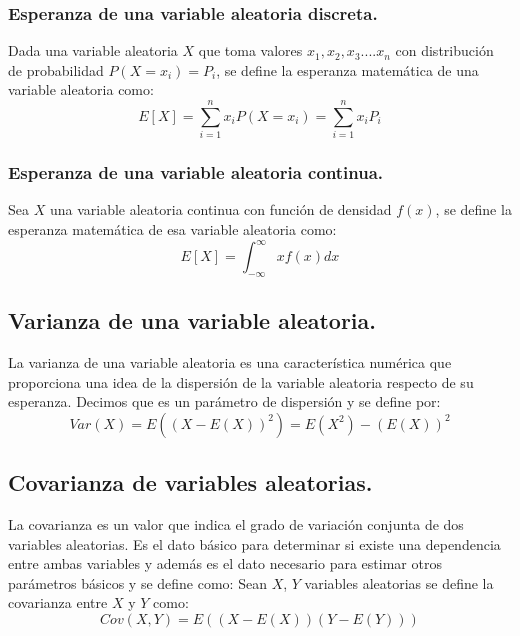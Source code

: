 \documentclass[
  12pt,
]{krantz}
\theoremstyle{definition}
\theoremstyle{definition}
\theoremstyle{definition}
\theoremstyle{remark}
\begin{document}
\hypertarget{esperanza-de-una-variable-aleatoria-discreta.}{%
\subsubsection{Esperanza de una variable aleatoria discreta.}\label{esperanza-de-una-variable-aleatoria-discreta.}}

Dada una variable aleatoria \(X\) que toma valores \(x_1,x_2,x_3....x_n\) con distribución de probabilidad \(P(X=x_i)=P_i\), se define la esperanza matemática de una variable aleatoria como: \[E[X]=\sum_{i=1}^{n}x_iP(X=x_i)=\sum_{i=1}^{n}x_iP_i\]

\hypertarget{esperanza-de-una-variable-aleatoria-continua.}{%
\subsubsection{Esperanza de una variable aleatoria continua.}\label{esperanza-de-una-variable-aleatoria-continua.}}

Sea \(X\) una variable aleatoria continua con función de densidad \(f(x)\), se define la esperanza matemática de esa variable aleatoria como:\[E[X]=\int_{-\infty}^{\infty}xf(x)dx\]

\hypertarget{varianza-de-una-variable-aleatoria.}{%
\subsection{Varianza de una variable aleatoria.}\label{varianza-de-una-variable-aleatoria.}}

La varianza de una variable aleatoria es una característica numérica que proporciona una idea de la dispersión de la variable aleatoria respecto de su esperanza. Decimos que es un parámetro de dispersión y se define por:\[Var(X)=E((X-E(X))^2)=E(X^2)-(E(X))^2\]

\hypertarget{covarianza-de-variables-aleatorias.}{%
\subsection{Covarianza de variables aleatorias.}\label{covarianza-de-variables-aleatorias.}}

La covarianza es un valor que indica el grado de variación conjunta de dos variables aleatorias. Es el dato básico para determinar si existe una dependencia entre ambas variables y además es el dato necesario para estimar otros parámetros básicos y se define como: Sean \(X\), \(Y\) variables aleatorias se define la covarianza entre \(X\) y \(Y\) como: \[Cov(X,Y)=E((X-E(X))(Y-E(Y)))\]
\end{document}

